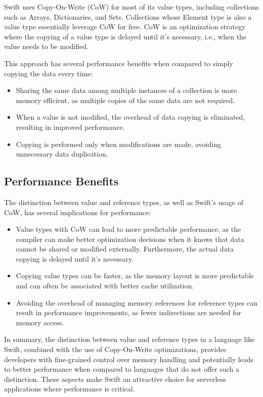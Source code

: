 Swift uses Copy-On-Write (CoW) for most of its value types, including collections such as Arrays, Dictionaries, and Sets. Collections whose Element type is also a value type essentially leverage CoW for free. CoW is an optimization strategy where the copying of a value type is delayed until it's necessary, i.e., when the value needs to be modified.

This approach has several performance benefits when compared to simply copying the data every time:

\begin{itemize}
  \item Sharing the same data among multiple instances of a collection is more memory efficient, as multiple copies of the same data are not required.
  \item When a value is not modified, the overhead of data copying is eliminated, resulting in improved performance.
  \item Copying is performed only when modifications are made, avoiding unnecessary data duplication.
\end{itemize}

\subsection{Performance Benefits}

The distinction between value and reference types, as well as Swift's usage of CoW, has several implications for performance:

\begin{itemize}
  \item Value types with CoW can lead to more predictable performance, as the compiler can make better optimization decisions when it knows that data cannot be shared or modified externally. Furthermore, the actual data copying is delayed until it's necessary.
  \item Copying value types can be faster, as the memory layout is more predictable and can often be associated with better cache utilization.
  \item Avoiding the overhead of managing memory references for reference types can result in performance improvements, as fewer indirections are needed for memory access.
\end{itemize}

In summary, the distinction between value and reference types in a language like Swift, combined with the use of Copy-On-Write optimizations, provides developers with fine-grained control over memory handling and potentially leads to better performance when compared to languages that do not offer such a distinction. These aspects make Swift an attractive choice for serverless applications where performance is critical.


